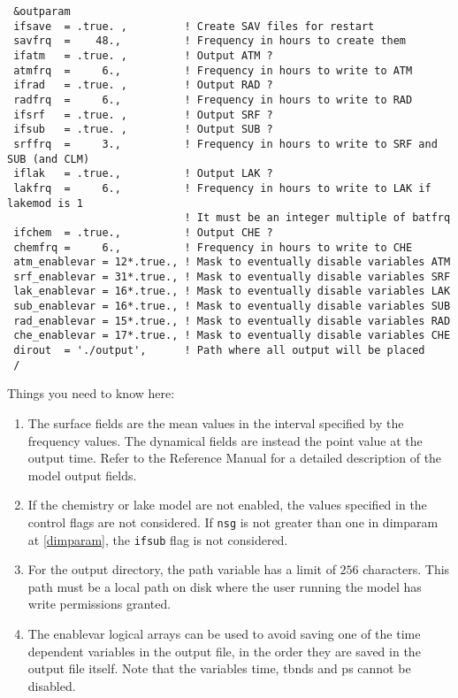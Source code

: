 {\footnotesize
\begin{Verbatim}
 &outparam
 ifsave  = .true. ,         ! Create SAV files for restart
 savfrq  =    48.,          ! Frequency in hours to create them
 ifatm   = .true. ,         ! Output ATM ?
 atmfrq  =     6.,          ! Frequency in hours to write to ATM
 ifrad   = .true. ,         ! Output RAD ?
 radfrq  =     6.,          ! Frequency in hours to write to RAD
 ifsrf   = .true. ,         ! Output SRF ?
 ifsub   = .true. ,         ! Output SUB ?
 srffrq  =     3.,          ! Frequency in hours to write to SRF and SUB (and CLM)
 iflak   = .true.,          ! Output LAK ?
 lakfrq  =     6.,          ! Frequency in hours to write to LAK if lakemod is 1
                            ! It must be an integer multiple of batfrq
 ifchem  = .true.,          ! Output CHE ?
 chemfrq =     6.,          ! Frequency in hours to write to CHE
 atm_enablevar = 12*.true., ! Mask to eventually disable variables ATM
 srf_enablevar = 31*.true., ! Mask to eventually disable variables SRF
 lak_enablevar = 16*.true., ! Mask to eventually disable variables LAK
 sub_enablevar = 16*.true., ! Mask to eventually disable variables SUB
 rad_enablevar = 15*.true., ! Mask to eventually disable variables RAD
 che_enablevar = 17*.true., ! Mask to eventually disable variables CHE
 dirout  = './output',      ! Path where all output will be placed
 /
\end{Verbatim}
}

Things you need to know here:

\begin{enumerate}
\item The surface fields are the mean values in the interval specified by
the frequency values. The dynamical fields are instead the point value at the
output time. Refer to the Reference Manual \cite{refman_11} for a detailed
description of the model output fields.
\item If the chemistry or lake model are not enabled, the values specified in
the control flags are not considered. If \verb=nsg= is not greater than one
in dimparam at \ref{dimparam}, the \verb=ifsub= flag is not considered.
\item For the output directory, the path variable has a limit of $256$
characters. This path must be a local path on disk where the user running
the model has write permissions granted.
\item The enablevar logical arrays can be used to avoid saving one of the time
dependent variables in the output file, in the order they are saved in the output
file itself. Note that the variables time, tbnds and ps cannot be disabled.
\end{enumerate}

